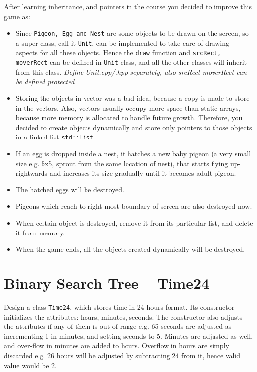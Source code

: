 \documentclass[a4paper,12pt]{article}
\begin{document}
		After learning inheritance, and pointers in the course you decided to improve this game as: 
		
	\begin{itemize}
			
		\item Since \texttt{Pigeon, Egg and Nest} are some objects to be drawn on the screen, so a super class, call it \texttt{Unit}, can be implemented to take care of drawing aspects for all these objects. Hence the \texttt{draw} function and \texttt{srcRect, moverRect} can be defined in \texttt{Unit} class, and all the other classes will inherit from this class. \textit{Define Unit.cpp/.hpp separately, also srcRect moverRect can be defined protected}
		
		\item Storing the objects in vector was a bad idea, because a copy is made to store in the vectors. Also, vectors usually occupy more space than static arrays, because more memory is allocated to handle future growth. Therefore, you decided to create objects dynamically and store only pointers to those objects in a linked list \texttt{\href{https://en.cppreference.com/w/cpp/container/list}{std::list}}.

		\item If an egg is dropped inside a nest, it hatches a new baby pigeon (a very small size e.g. 5x5, sprout from the same location of nest), that starts flying up-rightwards and increases its size gradually until it becomes adult pigeon. 
		
		\item The hatched eggs will be destroyed. 
		
		\item Pigeons which reach to right-most boundary of screen are also destroyed now.
	
		\item When certain object is destroyed, remove it from its particular list, and delete it from memory.
		
		\item When the game ends, all the objects created dynamically will be destroyed.
		
	\end{itemize}
	
		 

\section{Binary Search Tree -- Time24}
Design a class \texttt{Time24}, which stores time in 24 hours format. Its constructor initializes the attributes: hours, minutes, seconds. The constructor also adjusts the attributes if any of them is out of range e.g. 65 seconds are adjusted as incrementing 1 in minutes, and setting seconds to 5. Minutes are adjusted as well, and over-flow in minutes are added to hours. Overflow in hours are simply discarded e.g. 26 hours will be adjusted by subtracting 24 from it, hence valid value would be 2.
\end{document}
